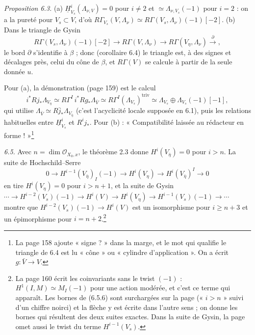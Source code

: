 \documentclass[11pt,a4paper]{article}
\begin{document}
\emph{Proposition 6.3.} (a) $\underline H^i_{V_s}(\Lambda_{\nu,V}) = 0$ pour
$i \neq 2$ et $\simeq \Lambda_{\nu,V_s}(-1)$ pour $i = 2$ : on a la pureté pour
$V_s \subset V$, d'où $R\Gamma_{V_s}(V, \Lambda_\nu) \simeq
R\Gamma(V_s, \Lambda_\nu)(-1)[-2]$. (b) Dans le triangle de Gysin
\[
  R\Gamma(V_s, \Lambda_\nu)(-1)[-2] \to R\Gamma(V, \Lambda_\nu) \to
  R\Gamma(V_\eta, \Lambda_\nu) \xrightarrow{\ \partial\ } ,
\]
le bord $\partial$ s'identifie à $\beta$ ; donc (corollaire 6.4) le triangle est,
à des signes et décalages près, celui du cône de $\beta$, et
$R\Gamma(V)$ se calcule à partir de la seule donnée $u$.

Pour (a), la démonstration (page 159) est le calcul
\[
  i^* Rj_*\Lambda_{V_\eta} \simeq R\Gamma^I\, i^* Rg_*\Lambda_{\bar V}
  \simeq R\Gamma^I(\Lambda_{V_s})^{\mathrm{triv}} \simeq \Lambda_{V_s} \oplus \Lambda_{V_s}(-1)[-1],
\]
qui utilise $\Lambda_{\bar V} \simeq R\bar j_*\Lambda_{V_{\bar\eta}}$ (c'est
l'acyclicité locale supposée en 6.1), puis les relations habituelles
entre $\underline H^i_{V_s}$ et $R^i j_*$. Pour (b) : « Compatibilité laissée au
rédacteur en forme ! »\footnote{La page 158 ajoute « signe ? » dans la marge, et
le mot qui qualifie le triangle de 6.4 est lu « cône » ou « cylindre
d'application ». On a écrit $g : \bar V \to V$.}

\emph{6.5.} Avec $n = \dim \mathcal{O}_{X_0,x}$, le théorème 2.3 donne
$H^i(V_{\bar\eta}) = 0$ pour $i > n$. La suite de Hochschild--Serre
\[
  0 \to H^{i-1}(V_{\bar\eta})_I(-1) \to H^i(V_\eta) \to H^i(V_{\bar\eta})^I \to 0
\]
en tire $H^i(V_\eta) = 0$ pour $i > n+1$, et la suite de Gysin
$\cdots \to H^{i-2}(V_s)(-1) \to H^i(V) \to H^i(V_\eta) \to H^{i-1}(V_s)(-1)
\to \cdots$ montre que $H^{i-2}(V_s)(-1) \to H^i(V)$ est un isomorphisme pour
$i \geq n+3$ et un épimorphisme pour $i = n + 2$.\footnote{La page 160 écrit les
coinvariants sans le twist $(-1)$ : $H^1(I, M) \simeq M_I(-1)$ pour une action
modérée, et c'est ce terme qui apparaît. Les bornes de (6.5.6) sont surchargées
sur la page (« $i > n$ » suivi d'un chiffre noirci) et la flèche y est écrite
dans l'autre sens ; on donne les bornes qui résultent des deux suites exactes.
Dans la suite de Gysin, la page omet aussi le twist du terme $H^{i-1}(V_s)$.}
\end{document}
